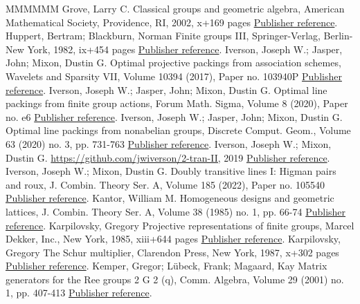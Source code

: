 \documentclass[11pt]{article}
\theoremstyle{definition}
\numberwithin{equation}{section}
\begin{document}
\begin{thebibliography}{MMMMMM}
 Grove, Larry C. Classical groups and geometric algebra, American Mathematical Society, Providence, RI, 2002, x+169 pages \href{https://alco.centre-mersenne.org/articles/10.5802/alco.324/#Grove:02}{Publisher reference}.
 Huppert, Bertram; Blackburn, Norman Finite groups III, Springer-Verlag, Berlin-New York, 1982, ix+454 pages \href{https://alco.centre-mersenne.org/articles/10.5802/alco.324/#HuppertB:82:III}{Publisher reference}.
 Iverson, Joseph W.; Jasper, John; Mixon, Dustin G. Optimal projective packings from association schemes, Wavelets and Sparsity VII, Volume 10394 (2017), Paper no. 103940P \href{https://alco.centre-mersenne.org/articles/10.5802/alco.324/#IversonJM:SPIE:17}{Publisher reference}.
 Iverson, Joseph W.; Jasper, John; Mixon, Dustin G. Optimal line packings from finite group actions, Forum Math. Sigma, Volume 8 (2020), Paper no. e6 \href{https://alco.centre-mersenne.org/articles/10.5802/alco.324/#IversonJM:17}{Publisher reference}.
 Iverson, Joseph W.; Jasper, John; Mixon, Dustin G. Optimal line packings from nonabelian groups, Discrete Comput. Geom., Volume 63 (2020) no. 3, pp. 731-763 \href{https://alco.centre-mersenne.org/articles/10.5802/alco.324/#IversonJM:19}{Publisher reference}.
 Iverson, Joseph W.; Mixon, Dustin G. \url{https://github.com/jwiverson/2-tran-II,} 2019 \href{https://alco.centre-mersenne.org/articles/10.5802/alco.324/#github}{Publisher reference}.
 Iverson, Joseph W.; Mixon, Dustin G. Doubly transitive lines I: Higman pairs and roux, J. Combin. Theory Ser. A, Volume 185 (2022), Paper no. 105540 \href{https://alco.centre-mersenne.org/articles/10.5802/alco.324/#IversonM:18}{Publisher reference}.
 Kantor, William M. Homogeneous designs and geometric lattices, J. Combin. Theory Ser. A, Volume 38 (1985) no. 1, pp. 66-74 \href{https://alco.centre-mersenne.org/articles/10.5802/alco.324/#Kantor:85}{Publisher reference}.
 Karpilovsky, Gregory Projective representations of finite groups, Marcel Dekker, Inc., New York, 1985, xiii+644 pages \href{https://alco.centre-mersenne.org/articles/10.5802/alco.324/#Karpilovsky:85}{Publisher reference}.
 Karpilovsky, Gregory The Schur multiplier, Clarendon Press, New York, 1987, x+302 pages \href{https://alco.centre-mersenne.org/articles/10.5802/alco.324/#Karpilovsky:87}{Publisher reference}.
 Kemper, Gregor; Lübeck, Frank; Magaard, Kay Matrix generators for the Ree groups  2 G 2 (q), Comm. Algebra, Volume 29 (2001) no. 1, pp. 407-413 \href{https://alco.centre-mersenne.org/articles/10.5802/alco.324/#KemperLM:01}{Publisher reference}.

\end{thebibliography}
\end{document}
